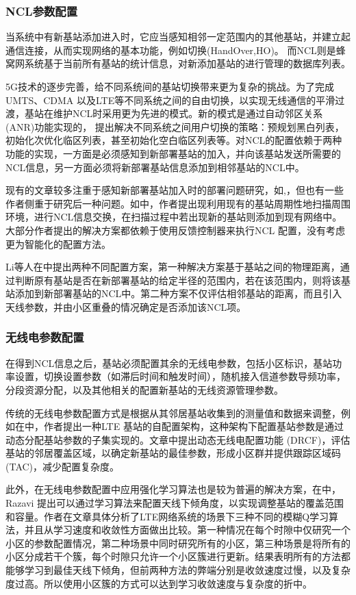 ﻿\documentclass[11pt,draftclsnofoot,onecolumn,journal,letterpaper]{IEEEtran}
\begin{document}
\subsubsection{NCL参数配置}

当系统中有新基站添加进入时，它应当感知相邻一定范围内的其他基站，并建立起通信连接，从而实现网络的基本功能，例如切换(HandOver,HO)。 而NCL则是蜂窝网系统基于当前所有基站的统计信息，对新添加基站的进行管理的数据库列表。

5G技术的逐步完善，给不同系统间的基站切换带来更为复杂的挑战。为了完成UMTS、CDMA 以及LTE等不同系统之间的自由切换，以实现无线通信的平滑过渡，基站在维护NCL时采用更为先进的模式。新的模式是通过自动邻区关系(ANR)功能实现的，\cite{3gpp.32.511} 提出解决不同系统之间用户切换的策略：预规划黑白列表，初始化次优化临区列表，甚至初始化空白临区列表等。对NCL的配置依赖于两种功能的实现，一方面是必须感知到新部署基站的加入，并向该基站发送所需要的NCL信息，另一方面必须将新部署基站信息添加到相邻基站的NCL中。

现有的文章较多注重于感知新部署基站加入时的部署问题研究，如\cite{Lee2014},\cite{Kim2010}，但也有一些作者侧重于研究后一种问题。如\cite{Wainio2016}中，作者提出现利用现有的基站周期性地扫描周围环境，进行NCL信息交换，在扫描过程中若出现新的基站则添加到现有网络中。大部分作者提出的解决方案都依赖于使用反馈控制器来执行NCL 配置，没有考虑更为智能化的配置方法。

Li等人在\cite{Li2007}中提出两种不同配置方案，第一种解决方案基于基站之间的物理距离，通过判断原有基站是否在新部署基站的给定半径的范围内，若在该范围内，则将该基站添加到新部署基站的NCL中。第二种方案不仅评估相邻基站的距离，而且引入天线参数，并由小区重叠的情况确定是否添加该NCL项。


\subsubsection{无线电参数配置}
在得到NCL信息之后，基站必须配置其余的无线电参数，包括小区标识，基站功率设置，切换设置参数（如滞后时间和触发时间），随机接入信道参数导频功率，分段资源分配，以及其他相关的配置新基站的无线资源管理参数。

传统的无线电参数配置方式是根据从其邻居基站收集到的测量值和数据来调整，例如在\cite{Sanneck2010}中，作者提出一种LTE 基站的自配置架构，这种架构下配置基站参数是通过动态分配基站参数的子集实现的。文章中提出动态无线电配置功能 (DRCF)，评估基站的邻居覆盖区域，以确定新基站的最佳参数，形成小区群并提供跟踪区域码(TAC)，减少配置复杂度。

此外，在无线电参数配置中应用强化学习算法也是较为普遍的解决方案，在\cite{Razavi2010}中，Razavi 提出可以通过学习算法来配置天线下倾角度，以实现调整基站的覆盖范围和容量。作者在文章具体分析了LTE网络系统的场景下三种不同的模糊Q学习算法，并且从学习速度和收敛性方面做出比较。第一种情况在每个时隙中仅研究一个小区的参数配置情况，第二种场景中同时研究所有的小区，第三种场景是将所有的小区分成若干个簇，每个时隙只允许一个小区簇进行更新。结果表明所有的方法都能够学习到最佳天线下倾角，但前两种方法的弊端分别是收敛速度过慢，以及复杂度过高。所以使用小区簇的方式可以达到学习收敛速度与复杂度的折中。
\end{document}
